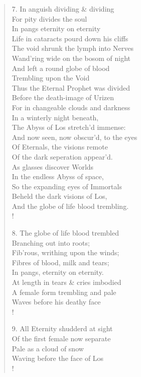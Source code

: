 \documentclass[9pt]{extarticle}
\begin{document}
\begin{verse}
\begin{altverse}
		7. In anguish dividing \& dividing\\
		For pity divides the soul\\
		In pangs eternity on eternity\\
		Life in cataracts pourd down his cliffs\\
		The void shrunk the lymph into Nerves\\
		Wand'ring wide on the bosom of night\\
		And left a round globe of blood\\
		Trembling upon the Void\\
		Thus the Eternal Prophet was divided\\
		Before the death-image of Urizen\\
		For in changeable clouds and darkness\\
		In a winterly night beneath,\\
		The Abyss of Los stretch'd immense:\\
		And now seen, now obscur'd, to the eyes\\
		Of Eternals, the visions remote\\
		Of the dark seperation appear'd.\\
		As glasses discover Worlds\\
		In the endless Abyss of space,\\
		So the expanding eyes of Immortals\\
		Beheld the dark visions of Los,\\
		And the globe of life blood trembling.\\!
		
		8. The globe of life blood trembled\\
		Branching out into roots;\\
		Fib'rous, writhing upon the winds;\\
		Fibres of blood, milk and tears;\\
		In pangs, eternity on eternity.\\
		At length in tears \& cries imbodied\\
		A female form trembling and pale\\
		Waves before his deathy face\\!
		
		9. All Eternity shudderd at sight\\
		Of the first female now separate\\
		Pale as a cloud of snow\\
		Waving before the face of Los\\!
		

\end{altverse}
\end{verse}
\end{document}
